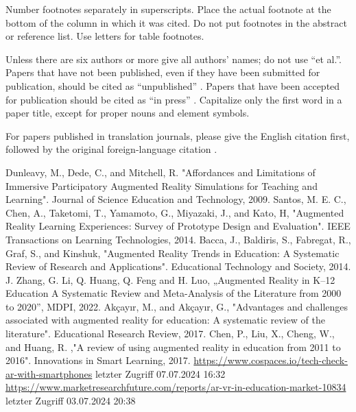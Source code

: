 \documentclass[conference]{IEEEtran}
\begin{document}
Number footnotes separately in superscripts. Place the actual footnote at 
the bottom of the column in which it was cited. Do not put footnotes in the 
abstract or reference list. Use letters for table footnotes.

Unless there are six authors or more give all authors' names; do not use 
``et al.''. Papers that have not been published, even if they have been 
submitted for publication, should be cited as ``unpublished'' \cite{b4}. Papers 
that have been accepted for publication should be cited as ``in press'' \cite{b5}. 
Capitalize only the first word in a paper title, except for proper nouns and 
element symbols.

For papers published in translation journals, please give the English 
citation first, followed by the original foreign-language citation \cite{b6}.

\begin{thebibliography}{00}
  Dunleavy, M., Dede, C., and Mitchell, R. "Affordances and Limitations of Immersive Participatory Augmented Reality Simulations for Teaching and Learning". Journal of Science Education and Technology, 2009.
 Santos, M. E. C., Chen, A., Taketomi, T., Yamamoto, G., Miyazaki, J., and Kato, H, "Augmented Reality Learning Experiences: Survey of Prototype
Design and Evaluation". IEEE Transactions on Learning Technologies, 2014.
 Bacca, J., Baldiris, S., Fabregat, R., Graf, S., and Kinshuk, "Augmented Reality Trends in Education: A Systematic Review of Research and Applications". Educational Technology and Society, 2014.
 J. Zhang, G. Li, Q. Huang, Q. Feng and H. Luo, „Augmented Reality in K–12 Education A Systematic Review and Meta-Analysis of the Literature from 2000 to 2020”, MDPI, 2022.
 Akçayır, M., and Akçayır, G., "Advantages and challenges associated with augmented reality for education: A systematic review of the literature". Educational Research Review, 2017.
 Chen, P., Liu, X., Cheng, W., and Huang, R. ,"A review of using augmented reality in education from 2011 to 2016". Innovations in Smart Learning, 2017.
 \href{https://www.cospaces.io/tech-check-ar-with-smartphones}{https://www.cospaces.io/tech-check-ar-with-smartphones} letzter Zugriff 07.07.2024 16:32
 \href{https://www.marketresearchfuture.com/reports/ar-vr-in-education-market-10834}{https://www.marketresearchfuture.com/reports/ar-vr-in-education-market-10834} letzter Zugriff 03.07.2024 20:38
\end{thebibliography}
\vspace{12pt}
\end{document}
